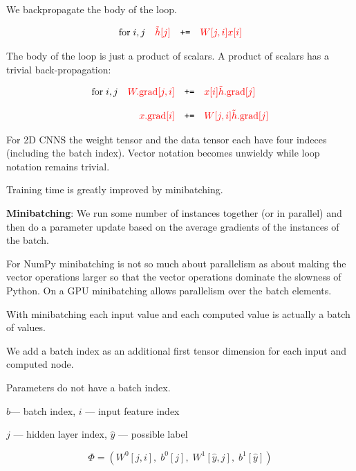 {
We backpropagate the body of the loop.

$$\begin{array}{lrcl}
\mathrm{for}\;i,j & {\color{red} \tilde{h}[j]} & \mbox{\tt +=} & {\color{red} W[j,i]x[i]}
\end{array}$$

\vfill
The body of the loop is just a product of scalars.  A product of scalars has a trivial back-propagation:

$$\begin{array}{lrcl}
\mathrm{for}\;i,j & {\color{red} W.\mathrm{grad}[j,i]} & \mbox{\tt +=} & {\color{red} x[i]\tilde{h}.\mathrm{grad}[j]} \\
\\
& {\color{red} x.\mathrm{grad}[i]} & \mbox{\tt +=} & {\color{red} W[j,i]\tilde{h}.\mathrm{grad}[j]} \\
\end{array}$$

\vfill For 2D CNNS the weight tensor and the data tensor each have four indeces (including the batch index).
Vector notation becomes unwieldy while loop notation remains trivial.


Training time is greatly improved by minibatching.

 \vfill
{\bf Minibatching}: We run some number of instances together (or in parallel) and then do a parameter update based on the average
gradients of the instances of the batch.

\vfill
For NumPy minibatching is not so much about parallelism as about making the vector operations larger so that the vector operations dominate
the slowness of Python.  On a GPU minibatching allows parallelism over the batch elements.
\vfill

\vfill
With minibatching each input value and each computed value is actually a batch of values.

\vfill
We add a batch index as an additional first tensor dimension for each input and computed node.

\vfill
Parameters do not have a batch index.


\centerline{$b$--- batch index,\hspace{3em} $i$ --- input feature index}
\centerline{$j$ --- hidden layer index, \hspace{3em} $\hat{y}$ --- possible label}
$$\Phi = (W^0[j,i],\;b^0[j],\;W^1[\hat{y},j],\;b^1[\hat{y}])$$

}
